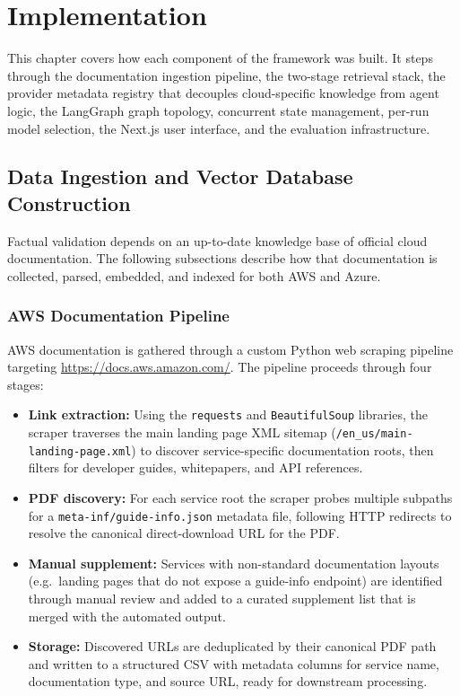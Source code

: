 \chapter{Implementation}

This chapter covers how each component of the framework was built. It steps through the documentation ingestion pipeline, the two-stage retrieval stack, the provider metadata registry that decouples cloud-specific knowledge from agent logic, the LangGraph graph topology, concurrent state management, per-run model selection, the Next.js user interface, and the evaluation infrastructure.

\section{Data Ingestion and Vector Database Construction}

Factual validation depends on an up-to-date knowledge base of official cloud documentation. The following subsections describe how that documentation is collected, parsed, embedded, and indexed for both AWS and Azure.

\subsection{AWS Documentation Pipeline}

AWS documentation is gathered through a custom Python web scraping pipeline targeting \url{https://docs.aws.amazon.com/}. The pipeline proceeds through four stages:

\begin{itemize}
    \item \textbf{Link extraction:} Using the \texttt{requests} and \texttt{BeautifulSoup} libraries, the scraper traverses the main landing page XML sitemap (\texttt{/en\_us/main-landing-page.xml}) to discover service-specific documentation roots, then filters for developer guides, whitepapers, and API references.
    \item \textbf{PDF discovery:} For each service root the scraper probes multiple subpaths for a \texttt{meta-inf/guide-info.json} metadata file, following HTTP redirects to resolve the canonical direct-download URL for the PDF.
    \item \textbf{Manual supplement:} Services with non-standard documentation layouts (e.g.\ landing pages that do not expose a guide-info endpoint) are identified through manual review and added to a curated supplement list that is merged with the automated output.
    \item \textbf{Storage:} Discovered URLs are deduplicated by their canonical PDF path and written to a structured CSV with metadata columns for service name, documentation type, and source URL, ready for downstream processing.
\end{itemize}

